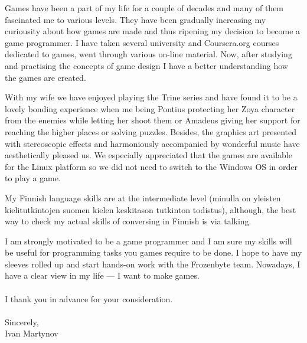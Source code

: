 \documentclass[]{article}
\begin{document}
Games have been a part of my life for a couple of decades and many of them
fascinated me to various levels. They have been gradually increasing my
curiousity about how games are made and thus ripening my decision to become a
game programmer. I have taken several university and Coursera.org courses
dedicated to games, went through various on-line material. Now, after studying
and practising the concepts of game design I have a better understanding how
the games are created.

With my wife we have enjoyed playing the Trine series and have found it to be a
lovely bonding experience when me being Pontius protecting her Zoya character
from the enemies while letting her shoot them or Amadeus giving her support for
reaching the higher places or solving puzzles. Besides, the graphics art
presented with stereoscopic effects and harmoniously accompanied by wonderful
music have aesthetically pleased us. We especially appreciated that the games
are available for the Linux platform so we did not need to switch to the Windows
OS in order to play a game.

My Finnish language skills are at the intermediate level (minulla on yleisten
kielitutkintojen suomen kielen keskitason tutkinton todistus), although, the
best way to check my actual skills of conversing in Finnish is via talking.


I am strongly motivated to be a game programmer and I am sure my skills will be
useful for programming tasks you games require to be done. I hope to have my
sleeves rolled up and start hands-on work with the Frozenbyte team.
Nowadays, I have a clear view in my life --- I want to make games.
\\\ \\

\noindent
I thank you in advance for your consideration.\\\ \\

\noindent Sincerely,\\
Ivan Martynov
\end{document}
